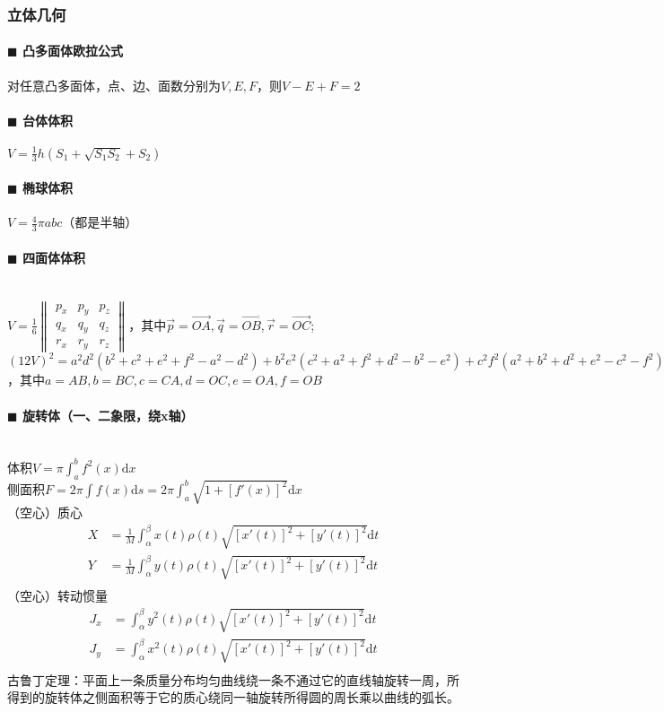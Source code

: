 \subsubsection{立体几何}
\paragraph{$\blacksquare$ 凸多面体欧拉公式}
对任意凸多面体，点、边、面数分别为$V, E, F$，则$V-E+F=2$
\paragraph{$\blacksquare$ 台体体积}
$V=\frac{1}{3}h(S_1+\sqrt {S_1S_2}+S_2)$
\paragraph{$\blacksquare$ 椭球体积}
$V=\frac{4}{3} \pi abc$（都是半轴）
\paragraph{$\blacksquare$ 四面体体积}
\noindent \\
$V=\frac{1}{6} \begin{Vmatrix} p_x & p_y & p_z\\ q_x & q_y & q_z\\ r_x & r_y & r_z \end{Vmatrix}$，其中$\vec p=\overrightarrow{OA}, \vec q=\overrightarrow{OB}, \vec r=\overrightarrow{OC}$;\\
$(12V)^2=a^2d^2(b^2+c^2+e^2+f^2-a^2-d^2)+b^2e^2(c^2+a^2+f^2+d^2-b^2-e^2)+c^2f^2(a^2+b^2+d^2+e^2-c^2-f^2)-a^2b^2c^2-a^2e^2f^2-d^2b^2f^2-d^2e^2c^2$，其中$a=AB,b=BC,c=CA,d=OC,e=OA,f=OB$
\paragraph{$\blacksquare$ 旋转体（一、二象限，绕x轴）}
\noindent \\
体积$V=\pi \int_{a}^{b} f^2(x) \mathrm{d} x$\\
侧面积$F=2\pi \int f(x) \mathrm{d} s=2\pi \int_{a}^{b} \sqrt{1+[f'(x)]^2} \mathrm{d} x$\\
（空心）质心
\begin{align*}
	X&=\frac{1}{M} \int_{\alpha}^{\beta} x(t) \rho (t) \sqrt{[x'(t)]^2+[y'(t)]^2} \mathrm{d} t\\
	Y&=\frac{1}{M} \int_{\alpha}^{\beta} y(t) \rho (t) \sqrt{[x'(t)]^2+[y'(t)]^2} \mathrm{d} t\\
\end{align*}
（空心）转动惯量
\begin{align*}
	J_x&=\int_{\alpha}^{\beta} y^2(t) \rho (t) \sqrt{[x'(t)]^2+[y'(t)]^2} \mathrm{d} t\\
	J_y&=\int_{\alpha}^{\beta} x^2(t) \rho (t) \sqrt{[x'(t)]^2+[y'(t)]^2} \mathrm{d} t\\
\end{align*}
古鲁丁定理：平面上一条质量分布均匀曲线绕一条不通过它的直线轴旋转一周，所得到的旋转体之侧面积等于它的质心绕同一轴旋转所得圆的周长乘以曲线的弧长。
